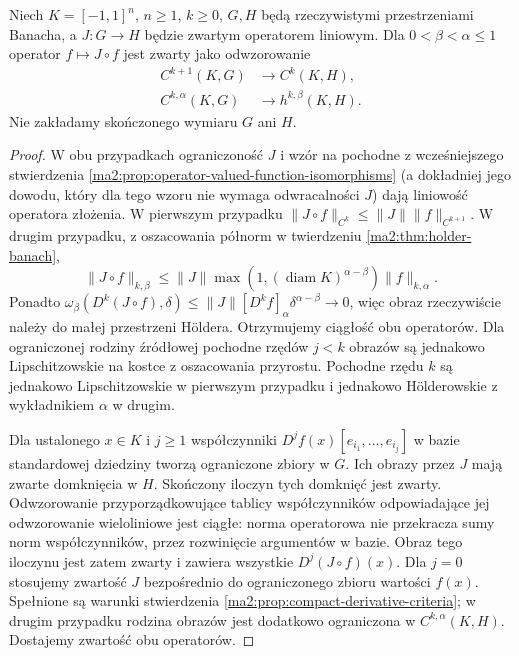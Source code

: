\begin{wniosek}
\label{ma2:cor:compact-value-operator}
Niech $K=[-1,1]^n$, $n\ge1$, $k\ge0$,
$G,H$ będą rzeczywistymi przestrzeniami Banacha,
a $J:G\to H$ będzie zwartym operatorem liniowym.
Dla $0<\beta<\alpha\le1$ operator
$f\mapsto J\circ f$ jest zwarty jako odwzorowanie
\[
 \begin{aligned}
 C^{k+1}(K,G)&\longrightarrow C^k(K,H),\\
 C^{k,\alpha}(K,G)&\longrightarrow h^{k,\beta}(K,H).
 \end{aligned}
\]
Nie zakładamy skończonego wymiaru $G$ ani $H$.
\end{wniosek}
\begin{proof}
W obu przypadkach ograniczoność $J$ i wzór
na pochodne z wcześniejszego stwierdzenia
\ref{ma2:prop:operator-valued-function-isomorphisms}
(a dokładniej jego dowodu, który dla tego wzoru
nie wymaga odwracalności $J$) dają liniowość
operatora złożenia. W pierwszym przypadku
$\|J\circ f\|_{C^k}\le\|J\|\|f\|_{C^{k+1}}$.
W drugim przypadku, z oszacowania półnorm
w twierdzeniu \ref{ma2:thm:holder-banach},
\[
 \|J\circ f\|_{k,\beta}
 \le\|J\|\max(1,(\operatorname{diam}K)^{\alpha-\beta})
             \|f\|_{k,\alpha}.
\]
Ponadto $\omega_\beta(D^k(J\circ f),\delta)
\le\|J\|[D^kf]_\alpha\delta^{\alpha-\beta}\to0$,
więc obraz rzeczywiście należy do małej przestrzeni
H\"oldera. Otrzymujemy ciągłość obu operatorów.
Dla ograniczonej rodziny źródłowej pochodne
rzędów $j<k$ obrazów są jednakowo Lipschitzowskie
na kostce z oszacowania przyrostu.
Pochodne rzędu $k$ są jednakowo Lipschitzowskie
w pierwszym przypadku i jednakowo H\"olderowskie
z wykładnikiem $\alpha$ w drugim.

Dla ustalonego $x\in K$ i $j\ge1$ współczynniki
$D^jf(x)[e_{i_1},\ldots,e_{i_j}]$ w bazie
standardowej dziedziny tworzą ograniczone
zbiory w $G$. Ich obrazy przez $J$ mają zwarte
domknięcia w $H$. Skończony iloczyn tych domknięć
jest zwarty. Odwzorowanie przyporządkowujące
tablicy współczynników odpowiadające jej
odwzorowanie wieloliniowe jest ciągłe:
norma operatorowa nie przekracza sumy norm
współczynników, przez rozwinięcie argumentów
w bazie. Obraz tego iloczynu jest zatem zwarty
i zawiera wszystkie $D^j(J\circ f)(x)$.
Dla $j=0$ stosujemy zwartość $J$ bezpośrednio
do ograniczonego zbioru wartości $f(x)$.
Spełnione są warunki stwierdzenia
\ref{ma2:prop:compact-derivative-criteria};
w drugim przypadku rodzina obrazów jest
dodatkowo ograniczona w $C^{k,\alpha}(K,H)$.
Dostajemy zwartość obu operatorów.
\end{proof}


